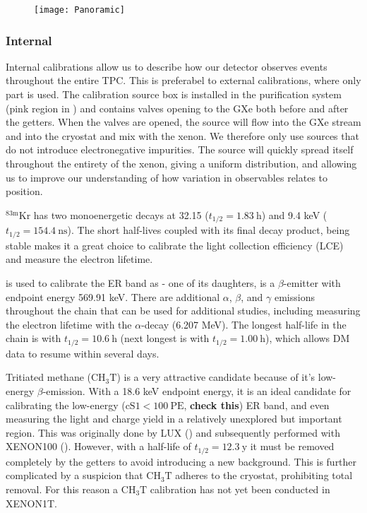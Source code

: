 \begin{figure}
\centering
\texttt{[image: Panoramic]}
\label{fig:xenon1t_panoramic}
\end{figure}

\subsubsection{Internal}
\label{subsubsec:xenon1t_calibrations_internal}
Internal calibrations allow us to describe how our detector observes events throughout the entire TPC.  This is preferabel to external
calibrations, where only part is used.  The calibration source box is installed in the purification system (pink region in
) and contains valves opening to the GXe both before and after the getters.  When the valves are opened,
the source will flow into the GXe stream and into the cryostat and mix with the xenon.  We therefore only use sources that do not introduce
electronegative impurities.  The source will quickly spread itself throughout the entirety of the xenon, giving a uniform distribution,
and allowing us to improve our understanding of how variation in observables relates to position.

$\mathrm{^{83m}Kr}$ has two monoenergetic decays at 32.15 ($t_{1/2} = 1.83\ \mathrm{h}$) and 9.4 keV
($t_{1/2} = 154.4\ \mathrm{ns}$).  The short
half-lives coupled with its final decay product,  being stable makes it a great choice to calibrate the light collection
efficiency (LCE) and measure the electron lifetime.

\radoncal is used to calibrate the ER band as  - one of its daughters, is a $\beta$-emitter with endpoint energy
569.91 keV.  There are additional $\alpha$, $\beta$, and $\gamma$ emissions throughout the chain that can be used for additional studies,
including measuring the electron lifetime with the  $\alpha$-decay (6.207 MeV).  The longest half-life in the chain is
 with $t_{1/2} = 10.6\ \mathrm{h}$ (next longest is  with $t_{1/2} = 1.00\ \mathrm{h}$), which allows DM data
to resume within several days.

Tritiated methane ($\mathrm{C H_3 T}$) is a very attractive candidate because of it's low-energy $\beta$-emission.  With a 18.6 keV
endpoint energy, it is an ideal candidate for calibrating the low-energy ($\mathrm{cS1} < 100\ \mathrm{PE}$, \textbf{check this}) ER band,
and even measuring
the light and charge yield in a relatively unexplored but important region.  This was originally done by LUX () and
subsequently performed with XENON100 ().  However, with a half-life of $t_{1/2} = 12.3\ \mathrm{y}$ it must be
removed completely by the getters to avoid introducing a new background.  This is further complicated by a suspicion that
$\mathrm{C H_3 T}$ adheres to the cryostat, prohibiting total removal.  For this reason a $\mathrm{C H_3 T}$ calibration has not yet been
conducted in XENON1T.

